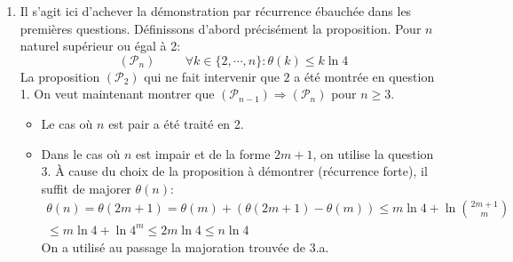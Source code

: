 \begin{enumerate}
\item Il s'agit ici d'achever la démonstration par récurrence ébauchée dans les premières questions. Définissons d'abord précisément la proposition. Pour $n$ naturel supérieur ou égal à 2:
\begin{displaymath}
 (\mathcal P_n)\hspace{1cm} \forall k\in\{2,\cdots,n\} : \theta(k)\leq k\ln 4
\end{displaymath}
La proposition $(\mathcal P_2)$ qui ne fait intervenir que $2$ a été montrée en question 1.\newline
On veut maintenant montrer que $(\mathcal P_{n-1})\Rightarrow(\mathcal P_{n})$ pour $n\geq 3$.
\begin{itemize}
 \item Le cas où $n$ est pair a été traité en 2.
\item Dans le cas où $n$ est impair et de la forme $2m+1$, on utilise la question 3. \`A cause du choix de la proposition à démontrer (récurrence forte), il suffit de majorer $\theta(n)$:
\begin{multline*}
 \theta(n) = \theta(2m+1)=\theta(m)+(\theta(2m+1)-\theta(m))
\leq m\ln 4 +\ln \binom{2m+1}{m}\\
\leq m\ln4 +\ln 4^m \leq 2m\ln 4 \leq n\ln 4
\end{multline*}
On a utilisé au passage la majoration trouvée de 3.a.
\end{itemize}

\end{enumerate}

